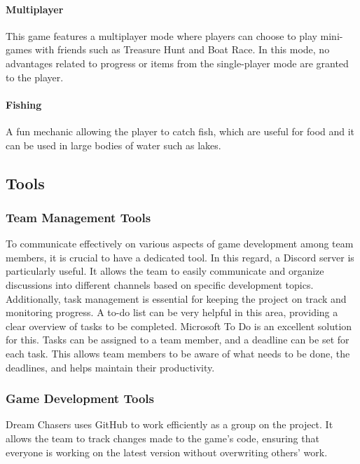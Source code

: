 \documentclass{article}
\begin{document}
\paragraph{Multiplayer}\hfill

This game features a multiplayer mode where players can choose to play mini-games with friends such as Treasure Hunt and Boat Race. In this mode, no advantages related to progress or items from the single-player mode are granted to the player.

\paragraph{Fishing}\hfill

A fun mechanic allowing the player to catch fish, which are useful for food and it can be used in large bodies of water such as lakes.



\subsection{Tools}
\subsubsection{Team Management Tools}\hfill

To communicate effectively on various aspects of game development among team members, it is crucial to have a dedicated tool. In this regard, a Discord server is particularly useful. It allows the team to easily communicate and organize discussions into different channels based on specific development topics.\\

Additionally, task management is essential for keeping the project on track and monitoring progress. A to-do list can be very helpful in this area, providing a clear overview of tasks to be completed. Microsoft To Do is an excellent solution for this. Tasks can be assigned to a team member, and a deadline can be set for each task. This allows team members to be aware of what needs to be done, the deadlines, and helps maintain their productivity.



\subsubsection{Game Development Tools}\hfill

Dream Chasers uses GitHub to work efficiently as a group on the project. It allows the team to track changes made to the game's code, ensuring that everyone is working on the latest version without overwriting others' work.\\
\end{document}
